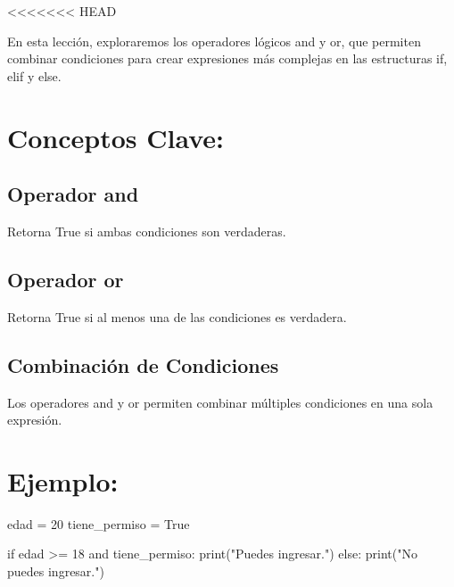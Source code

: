 \documentclass[
  a4paper,
  onepage,
  openany]{scrreprt}
\newenvironment{Shaded}{\begin{snugshade}}{\end{snugshade}}
\newcommand{\BuiltInTok}[1]{\textcolor[rgb]{0.00,0.23,0.31}{#1}}
\newcommand{\ControlFlowTok}[1]{\textcolor[rgb]{0.00,0.23,0.31}{#1}}
\newcommand{\DecValTok}[1]{\textcolor[rgb]{0.68,0.00,0.00}{#1}}
\newcommand{\KeywordTok}[1]{\textcolor[rgb]{0.00,0.23,0.31}{#1}}
\newcommand{\NormalTok}[1]{\textcolor[rgb]{0.00,0.23,0.31}{#1}}
\newcommand{\OperatorTok}[1]{\textcolor[rgb]{0.37,0.37,0.37}{#1}}
\newcommand{\StringTok}[1]{\textcolor[rgb]{0.13,0.47,0.30}{#1}}
\newcommand{\VariableTok}[1]{\textcolor[rgb]{0.07,0.07,0.07}{#1}}
\begin{document}
\textless\textless\textless\textless\textless\textless\textless{} HEAD

En esta lección, exploraremos los operadores lógicos and y or, que
permiten combinar condiciones para crear expresiones más complejas en
las estructuras if, elif y else.

\hypertarget{conceptos-clave-34}{%
\section{Conceptos Clave:}\label{conceptos-clave-34}}

\hypertarget{operador-and}{%
\subsection{Operador and}\label{operador-and}}

Retorna True si ambas condiciones son verdaderas.

\hypertarget{operador-or}{%
\subsection{Operador or}\label{operador-or}}

Retorna True si al menos una de las condiciones es verdadera.

\hypertarget{combinaciuxf3n-de-condiciones}{%
\subsection{Combinación de
Condiciones}\label{combinaciuxf3n-de-condiciones}}

Los operadores and y or permiten combinar múltiples condiciones en una
sola expresión.

\hypertarget{ejemplo-34}{%
\section{Ejemplo:}\label{ejemplo-34}}

\begin{Shaded}
\begin{Highlighting}[]
\NormalTok{edad }\OperatorTok{=} \DecValTok{20}
\NormalTok{tiene\_permiso }\OperatorTok{=} \VariableTok{True}

\ControlFlowTok{if}\NormalTok{ edad }\OperatorTok{\textgreater{}=} \DecValTok{18} \KeywordTok{and}\NormalTok{ tiene\_permiso:}
    \BuiltInTok{print}\NormalTok{(}\StringTok{"Puedes ingresar."}\NormalTok{)}
\ControlFlowTok{else}\NormalTok{:}
    \BuiltInTok{print}\NormalTok{(}\StringTok{"No puedes ingresar."}\NormalTok{)}
\end{Highlighting}
\end{Shaded}
\end{document}
